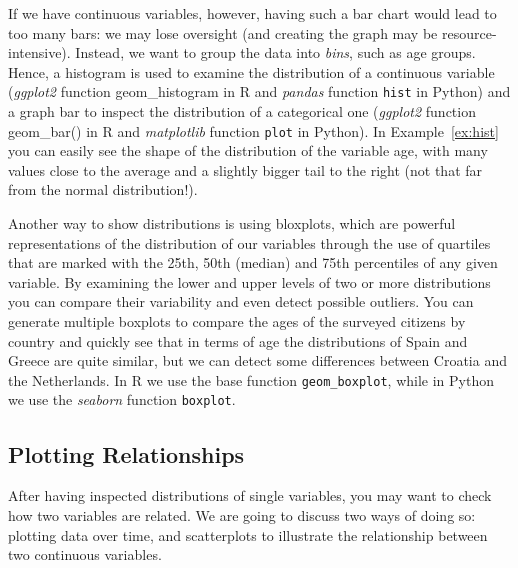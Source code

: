 
If we have continuous variables, however, having such a bar chart would lead to too many bars: we may lose oversight (and creating the graph may be resource-intensive). Instead, we want to group the data into \emph{bins}, such as age groups.
Hence, a histogram is used to examine the distribution of a continuous variable (\emph{ggplot2} function geom\_histogram in R and \emph{pandas} function \texttt{hist} in Python) and a graph bar to inspect the distribution of a categorical one (\emph{ggplot2} function geom\_bar() in R and \emph{matplotlib} function \texttt{plot} in Python). In Example~\ref{ex:hist} you can easily see the shape of the distribution of the variable age, with many values close to the average and a slightly bigger tail to the right (not that far from the normal distribution!).


Another way to show distributions is using bloxplots, which are powerful representations of the distribution of our variables through the use of quartiles that are marked with the 25th, 50th (median) and 75th percentiles of any given variable. By examining the lower and upper levels of two or more distributions you can compare their variability and even detect possible outliers. You can generate multiple boxplots to compare the ages of the surveyed citizens by country and quickly see that in terms of age the distributions of Spain and Greece are quite similar, but we can detect some differences between Croatia and the Netherlands. In R we use the base function \texttt{geom\_boxplot}, while in Python we use the \emph{seaborn} function \texttt{boxplot}.





\subsection{Plotting Relationships}

After having inspected distributions of single variables, you may want to check how two variables are related. We are going to discuss two ways of doing so: plotting data over time, and scatterplots to illustrate the relationship between two continuous variables.

